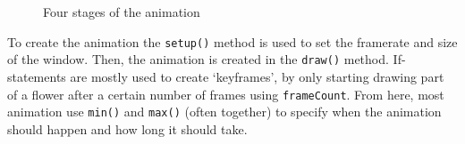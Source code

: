 \begin{figure}[H]
\begin{subfigure}[t]{.35\textwidth}
    \end{subfigure}

    \caption{Four stages of the animation}
    \label{fig: animation}

\end{figure}

To create the animation the \texttt{setup()} method is used to set the framerate and size of the window. Then, the animation is created in the \texttt{draw()} method. If-statements are mostly used to create `keyframes', by only starting drawing part of a flower after a certain number of frames using \texttt{frameCount}. From here, most animation use \texttt{min()} and \texttt{max()} (often together) to specify when the animation should happen and how long it should take.
